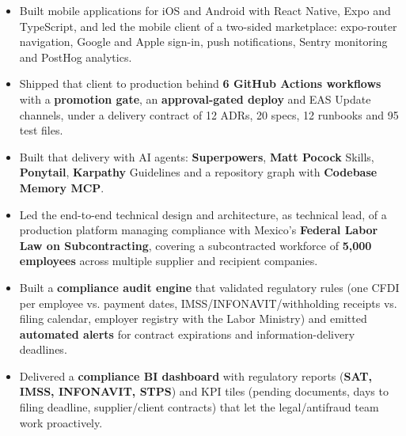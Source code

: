{%
\begin{itemize}
    \item Built mobile applications for iOS and Android with React Native, Expo and TypeScript, and led the mobile client of a two-sided marketplace: expo-router navigation, Google and Apple sign-in, push notifications, Sentry monitoring and PostHog analytics.
    \item Shipped that client to production behind \textbf{6 GitHub Actions workflows} with a \textbf{promotion gate}, an \textbf{approval-gated deploy} and EAS Update channels, under a delivery contract of 12 ADRs, 20 specs, 12 runbooks and 95 test files.
    \item Built that delivery with AI agents: \textbf{Superpowers}, \textbf{Matt Pocock} Skills, \textbf{Ponytail}, \textbf{Karpathy} Guidelines and a repository graph with \textbf{Codebase Memory MCP}.
\end{itemize}

\begin{itemize}
    \item Led the end-to-end technical design and architecture, as technical lead, of a production platform managing compliance with Mexico's \textbf{Federal Labor Law on Subcontracting}, covering a subcontracted workforce of \textbf{5,000 employees} across multiple supplier and recipient companies.
    \item Built a \textbf{compliance audit engine} that validated regulatory rules (one CFDI per employee vs. payment dates, IMSS/INFONAVIT/withholding receipts vs. filing calendar, employer registry with the Labor Ministry) and emitted \textbf{automated alerts} for contract expirations and information-delivery deadlines.
    \item Delivered a \textbf{compliance BI dashboard} with regulatory reports (\textbf{SAT, IMSS, INFONAVIT, STPS}) and KPI tiles (pending documents, days to filing deadline, supplier/client contracts) that let the legal/antifraud team work proactively.
\end{itemize}
}

